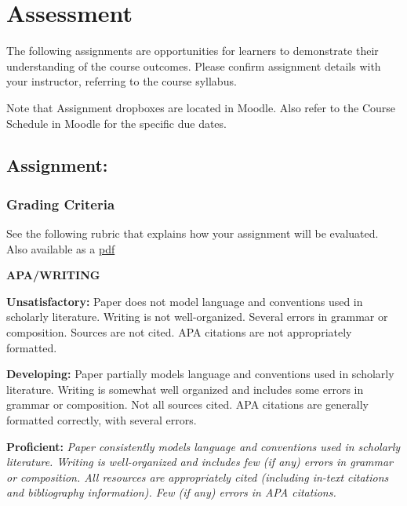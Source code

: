 \documentclass[
]{book}
\begin{document}
\hypertarget{assessment}{%
\chapter*{Assessment}\label{assessment}}

The following assignments are opportunities for learners to demonstrate their understanding of the course outcomes. Please confirm assignment details with your instructor, referring to the course syllabus.

Note that Assignment dropboxes are located in Moodle. Also refer to the Course Schedule in Moodle for the specific due dates.

\hypertarget{assignment}{%
\section*{Assignment:}\label{assignment}}

\hypertarget{grading-criteria}{%
\subsection*{Grading Criteria}\label{grading-criteria}}

See the following rubric that explains how your assignment will be evaluated. Also available as a \href{assets/assessment/Identity-as-a-Teacher-RUBRIC.pdf}{pdf}

\textbf{APA/WRITING}

\textbf{Unsatisfactory:} Paper does not model language and conventions used in scholarly literature. Writing is not well-organized. Several errors in grammar or composition. Sources are not cited. APA citations are not appropriately formatted.

\textbf{Developing:} Paper partially models language and conventions used in scholarly literature. Writing is somewhat well organized and includes some errors in grammar or composition. Not all sources cited. APA citations are generally formatted correctly, with several errors.

\textbf{Proficient:} \emph{Paper consistently models language and conventions used in scholarly literature. Writing is well-organized and includes few (if any) errors in grammar or composition. All resources are appropriately cited (including in-text citations and bibliography information). Few (if any) errors in APA citations.}
\end{document}
